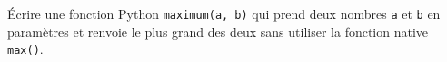 \begin{exo}
	Écrire une fonction Python \lstinline|maximum(a, b)| qui prend deux nombres \lstinline|a| et \lstinline|b| en paramètres et renvoie le plus grand des deux sans utiliser la fonction native \lstinline|max()|.
\end{exo}
